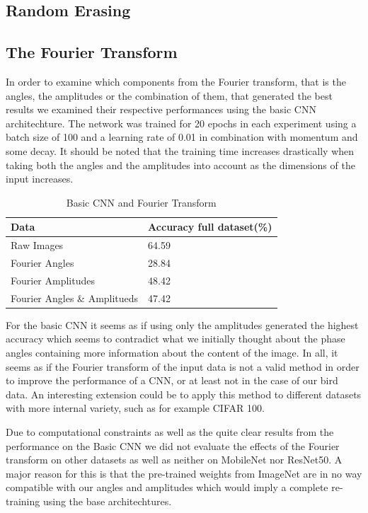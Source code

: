 \documentclass{article}
\begin{document}
\subsection{Random Erasing}

\subsection{The Fourier Transform}

In order to examine which components from the Fourier transform, that is the angles, the amplitudes or the combination of them, that generated the best results we examined their respective performances using the basic CNN architechture. The network was trained for 20 epochs in each experiment using a batch size of 100 and a learning rate of 0.01 in combination with momentum and some decay. It should be noted that the training time increases drastically when taking both the angles and the amplitudes into account as the dimensions of the input increases.

\begin{table}[H]
  \caption{Basic CNN and Fourier Transform}
  \label{sample-table}
  \centering
  \begin{tabular}{ll}
    \toprule
    Data & Accuracy full dataset(\%) \\
    \midrule
    Raw Images  & 64.59 \\
    Fourier Angles & 28.84   \\
    Fourier Amplitudes & 48.42 \\
    Fourier Angles \& Amplitueds & 47.42 \\
    \bottomrule
  \end{tabular}
\end{table}

For the basic CNN it seems as if using only the amplitudes generated the highest accuracy which seems to contradict what we initially thought about the phase angles containing more information about the content of the image. In all, it seems as if the Fourier transform of the input data is not a valid method in order to improve the performance of a CNN, or at least not in the case of our bird data. An interesting extension could be to apply this method to different datasets with more internal variety, such as for example CIFAR 100.

\medskip

Due to computational constraints as well as the quite clear results from the performance on the Basic CNN we did not evaluate the effects of the Fourier transform on other datasets as well as neither on MobileNet nor ResNet50. A major reason for this is that the pre-trained weights from ImageNet are in no way compatible with our angles and amplitudes which would imply a complete re-training using the base architechtures.
\end{document}

